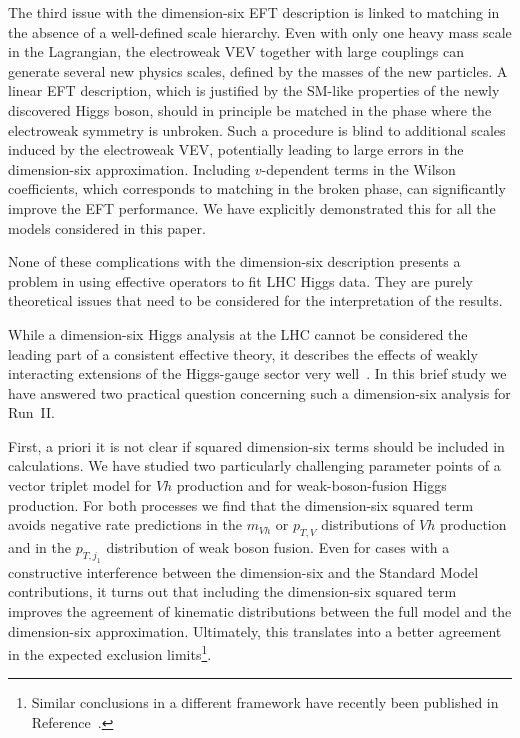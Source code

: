 The third issue with the dimension-six EFT description is linked to
matching in the absence of a well-defined scale hierarchy.  Even with
only one heavy mass scale in the Lagrangian, the electroweak VEV
together with large couplings can generate several new physics scales,
defined by the masses of the new particles.  A linear EFT description,
which is justified by the SM-like properties of the newly discovered
Higgs boson, should in principle be matched in the phase where the
electroweak symmetry is unbroken. Such a procedure is blind to
additional scales induced by the electroweak VEV, potentially leading
to large errors in the dimension-six approximation.  Including
$v$-dependent terms in the Wilson coefficients, which corresponds to
matching in the broken phase, can significantly improve the EFT
performance. We have explicitly demonstrated this for all the models
considered in this paper.

None of these complications with the dimension-six description presents
a problem in using effective operators to fit LHC Higgs data.  They
are purely theoretical issues that need to be considered for the
interpretation of the results.



While a dimension-six Higgs analysis at the LHC cannot be considered the
leading part of a consistent effective theory, it describes the
effects of weakly interacting extensions of the Higgs-gauge sector very
well~\cite{too_long}. In this brief study we have answered two practical
question concerning such a dimension-six analysis for Run~II.

First, a priori it is not clear if squared dimension-six terms should be
included in calculations. We have studied two particularly challenging
parameter points of a vector triplet model for $Vh$ production and for
weak-boson-fusion Higgs production. For both processes we find that
the dimension-six squared term avoids negative rate predictions in the
$m_{Vh}$ or $p_{T,V}$ distributions of $Vh$ production and in the
$p_{T,j_1}$ distribution of weak boson fusion. Even for cases with a
constructive interference between the dimension-six and the Standard
Model contributions, it turns out that including the dimension-six
squared term improves the agreement of kinematic distributions between
the full model and the dimension-six approximation. Ultimately, this
translates into a better agreement in the expected exclusion
limits\footnote{Similar conclusions in a different framework have recently
been published in Reference~\cite{gino}.}.

